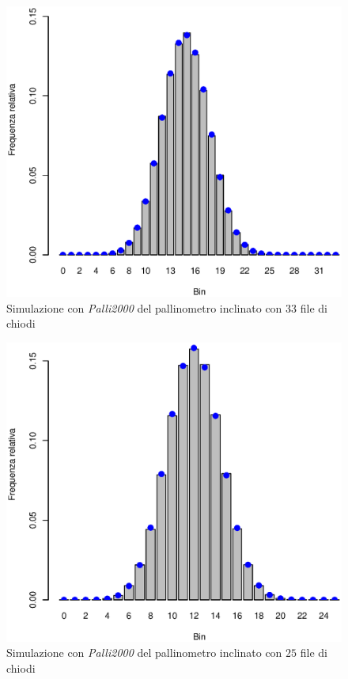 \documentclass[10pt,oneside,a4paper]{article}
\begin{document}
\begin{figure}[H]
\caption{Simulazione con \emph{Palli2000} del pallinometro inclinato con $33$ file di chiodi}
\label{fig:palli2000_inclinato_33}
\centering
\includegraphics[scale=0.5]{palli200_inclinato_1.eps}
\end{figure}
\begin{figure}[H]
\caption{Simulazione con \emph{Palli2000} del pallinometro inclinato con $25$ file di chiodi}
\label{fig:palli2000_inclinato_25}
\centering
\includegraphics[scale=0.5]{palli200_inclinato_2.eps}
\end{figure}
\end{document}
